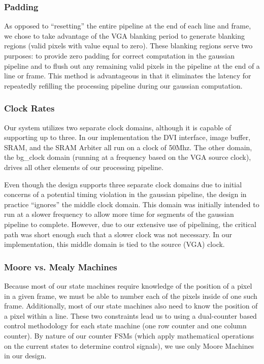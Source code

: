 \subsubsection{Padding}

As opposed to ``resetting'' the entire pipeline at the end of each line
and frame, we chose to take advantage of the VGA blanking period to generate
blanking regions (valid pixels with value equal to zero). These blanking regions 
serve two purposes: to provide zero
padding for correct computation in the gaussian pipeline and to flush out 
any remaining valid pixels in the pipeline at the end of a line or frame.
This method is advantageous in that it eliminates the latency for
repeatedly refilling the processing pipeline during our gaussian computation.

\subsubsection{Clock Rates}

Our system utilizes two separate clock domains, although it is capable of
supporting up to three. In our implementation the DVI interface, image buffer, 
SRAM, and the SRAM Arbiter all run on a clock of 50Mhz. The other domain, the
bg\_clock domain (running at a frequency based on the VGA source clock), drives
all other elements of our processing pipeline.

Even though the design supports three separate clock domains due to initial concerns
of a potential timing violation in the gaussian pipeline, the design in practice
``ignores'' the middle clock domain. This domain was initially intended to run
at a slower frequency to allow more time for segments of the gaussian pipeline 
to complete. However, due to our extensive use of pipelining, the critical path was
short enough such that a slower clock was not necessary. In our implementation,
this middle domain is tied to the source (VGA) clock.

\subsubsection{Moore vs. Mealy Machines}

Because most of our state machines require knowledge of the position of a pixel
in a given frame, we must be able to number each of the pixels inside of one 
such frame. Additionally, most of our state machines also need to know the position
of a pixel within a line. These two constraints lead us to using a dual-counter
based control methodology for each state machine (one row counter and one column counter). 
By nature of our counter FSMs (which apply mathematical operations on the current states 
to determine control signals), we use only Moore Machines in our design.

